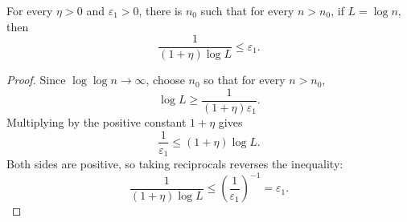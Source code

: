 \begin{helper}
For every \(\eta>0\) and \(\varepsilon_1>0\), there is \(n_0\) such that
for every \(n>n_0\), if \(L=\log n\), then
\[
\frac1{(1+\eta)\log L}\le\varepsilon_1.
\]
\end{helper}
\begin{proof}
Since \(\log\log n\to\infty\), choose \(n_0\) so that for every \(n>n_0\),
\[
\log L\ge \frac1{(1+\eta)\varepsilon_1}.
\]
Multiplying by the positive constant \(1+\eta\) gives
\[
\frac1{\varepsilon_1}\le (1+\eta)\log L.
\]
Both sides are positive, so taking reciprocals reverses the inequality:
\[
\frac1{(1+\eta)\log L}\le
\left(\frac1{\varepsilon_1}\right)^{-1}=\varepsilon_1.
\]
\end{proof}
